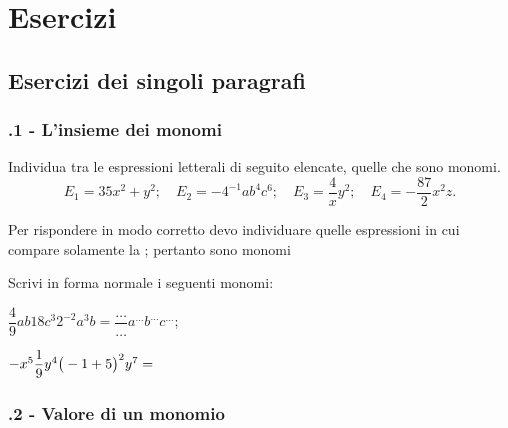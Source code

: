 \section{Esercizi}
\subsection{Esercizi dei singoli paragrafi}
\subsubsection*{\thechapter.1 - L'insieme dei monomi}
\begin{esercizio}
\label{ese:10.1}
Individua tra le espressioni letterali di seguito elencate, quelle che sono monomi.
\[E_{1}=35x^{2}+y^{2};\quad E_{2}=-4^{-1}ab^{4}c^{6};\quad E_{3}=\dfrac{4}{x}y^{2};\quad E_{4}=-{\frac{87}{2}}x^{2}z.\]

Per rispondere in modo corretto devo individuare quelle espressioni in
cui compare solamente la \dotfill; pertanto sono monomi \dotfill
\end{esercizio}

\begin{esercizio}
\label{ese:10.2}
Scrivi in forma normale i seguenti monomi:
\begin{multicols}{2}
\begin{enumeratea}
 \item $\dfrac{4}{9}ab18c^{3}2^{-2}a^{3}b=\dfrac{\ldots }{\ldots }a^{\ldots}b^{\ldots }c^{\ldots }$;
 \item $-x^{5}\dfrac{1}{9}y^{4}\big(-1+5\big)^{2}y^{7}=\dotfill~$
\end{enumeratea}
\end{multicols}
\end{esercizio}


\subsubsection*{\thechapter.2 - Valore di un monomio}

